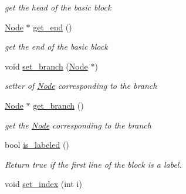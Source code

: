 \begin{DoxyCompactItemize}
\begin{DoxyCompactList}\small\item\em get the head of the basic block \end{DoxyCompactList}\item 
\hypertarget{classBasic__block_ae914e0179d58835b213bad613bfbaf40}{\hyperlink{classNode}{\-Node} $\ast$ \hyperlink{classBasic__block_ae914e0179d58835b213bad613bfbaf40}{get\-\_\-end} ()}\label{classBasic__block_ae914e0179d58835b213bad613bfbaf40}

\begin{DoxyCompactList}\small\item\em get the end of the basic block \end{DoxyCompactList}\item 
\hypertarget{classBasic__block_a4930bdd8a990cfb2d10f39087306a75e}{void \hyperlink{classBasic__block_a4930bdd8a990cfb2d10f39087306a75e}{set\-\_\-branch} (\hyperlink{classNode}{\-Node} $\ast$)}\label{classBasic__block_a4930bdd8a990cfb2d10f39087306a75e}

\begin{DoxyCompactList}\small\item\em setter of \hyperlink{classNode}{\-Node} corresponding to the branch \end{DoxyCompactList}\item 
\hypertarget{classBasic__block_a5015a11dd64de82b6480a86ded7d720b}{\hyperlink{classNode}{\-Node} $\ast$ \hyperlink{classBasic__block_a5015a11dd64de82b6480a86ded7d720b}{get\-\_\-branch} ()}\label{classBasic__block_a5015a11dd64de82b6480a86ded7d720b}

\begin{DoxyCompactList}\small\item\em get the \hyperlink{classNode}{\-Node} corresponding to the branch \end{DoxyCompactList}\item 
\hypertarget{classBasic__block_a94840ac976b27d9024f4c04efb276ac1}{bool \hyperlink{classBasic__block_a94840ac976b27d9024f4c04efb276ac1}{is\-\_\-labeled} ()}\label{classBasic__block_a94840ac976b27d9024f4c04efb276ac1}

\begin{DoxyCompactList}\small\item\em \-Return true if the first line of the block is a label. \end{DoxyCompactList}\item 
\hypertarget{classBasic__block_a5bdba6b1e3307dc03c38b8249c4b3fa8}{void \hyperlink{classBasic__block_a5bdba6b1e3307dc03c38b8249c4b3fa8}{set\-\_\-index} (int i)}\label{classBasic__block_a5bdba6b1e3307dc03c38b8249c4b3fa8}


\end{DoxyCompactItemize}
